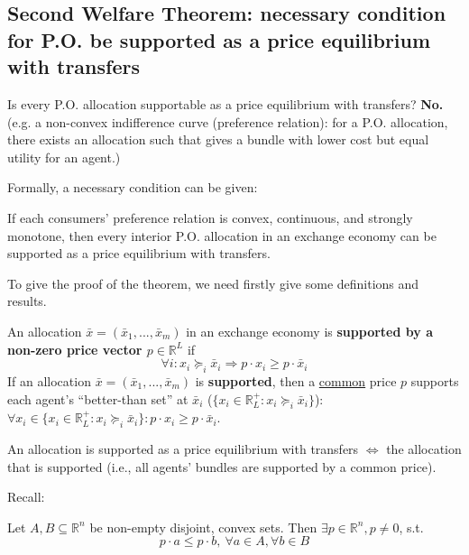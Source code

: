 \documentclass[11pt]{elegantbook}
\begin{document}
\subsection{Second Welfare Theorem: necessary condition for P.O. be supported as a price equilibrium with transfers}
\begin{remark}
    Is every P.O. allocation supportable as a price equilibrium with transfers? \textbf{No.} (e.g. a non-convex indifference curve (preference relation): for a P.O. allocation, there exists an allocation such that gives a bundle with lower cost but equal utility for an agent.)
\end{remark}
Formally, a necessary condition can be given:
\begin{theorem}\label{SWT_sup}
    If each consumers' preference relation is convex, continuous, and strongly monotone, then every interior P.O. allocation in an exchange economy can be supported as a price equilibrium with transfers.
\end{theorem}
To give the proof of the theorem, we need firstly give some definitions and results.
\begin{definition}
    \normalfont
    An allocation $\bar{x}=\left(\bar{x}_1,...,\bar{x}_m\right)$ in an exchange economy is \textbf{supported by a non-zero price vector $p\in \mathbb{R}^L$} if $$\forall i: x_i\succeq_i\bar{x}_i \Rightarrow p\cdot x_i\geq p\cdot\bar{x}_i$$
    If an allocation $\bar{x}=\left(\bar{x}_1,...,\bar{x}_m\right)$ is \textbf{supported}, then a \underline{common} price $p$ supports each agent's ``better-than set'' at $\bar{x}_i$ ($\{x_i\in \mathbb{R}_L^+: x_i\succeq_i\bar{x}_i\}$): $\forall x_i\in \{x_i\in \mathbb{R}_L^+: x_i\succeq_i\bar{x}_i\}: p\cdot x_i\geq p\cdot \bar{x}_i$.
\end{definition}
\begin{note}
    An allocation is supported as a price equilibrium with transfers $\Leftrightarrow$ the allocation that is supported (i.e., all agents' bundles are supported by a common price).
\end{note}

Recall:
\begin{theorem}\label{SHT}
    Let $A,B\subseteq \mathbb{R}^n$ be non-empty disjoint, convex sets. Then $\exists p\in \mathbb{R}^n,p\neq 0$, s.t. $$p\cdot a\leq p\cdot b,\ \forall a\in A, \forall b\in B$$
\end{theorem}
\end{document}
